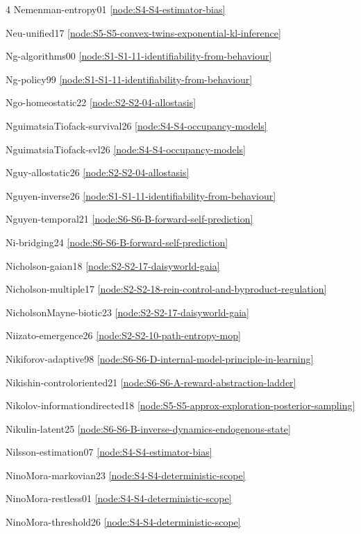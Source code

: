 \documentclass[10pt]{article}
\begin{document}
{\begin{multicols}{4}
Nemenman-entropy01 \hfill \ref{node:S4-S4-estimator-bias}\par
Neu-unified17 \hfill \ref{node:S5-S5-convex-twins-exponential-kl-inference}\par
Ng-algorithms00 \hfill \ref{node:S1-S1-11-identifiability-from-behaviour}\par
Ng-policy99 \hfill \ref{node:S1-S1-11-identifiability-from-behaviour}\par
Ngo-homeostatic22 \hfill \ref{node:S2-S2-04-allostasis}\par
NguimatsiaTiofack-survival26 \hfill \ref{node:S4-S4-occupancy-models}\par
NguimatsiaTiofack-svl26 \hfill \ref{node:S4-S4-occupancy-models}\par
Nguy-allostatic26 \hfill \ref{node:S2-S2-04-allostasis}\par
Nguyen-inverse26 \hfill \ref{node:S1-S1-11-identifiability-from-behaviour}\par
Nguyen-temporal21 \hfill \ref{node:S6-S6-B-forward-self-prediction}\par
Ni-bridging24 \hfill \ref{node:S6-S6-B-forward-self-prediction}\par
Nicholson-gaian18 \hfill \ref{node:S2-S2-17-daisyworld-gaia}\par
Nicholson-multiple17 \hfill \ref{node:S2-S2-18-rein-control-and-byproduct-regulation}\par
NicholsonMayne-biotic23 \hfill \ref{node:S2-S2-17-daisyworld-gaia}\par
Niizato-emergence26 \hfill \ref{node:S2-S2-10-path-entropy-mop}\par
Nikiforov-adaptive98 \hfill \ref{node:S6-S6-D-internal-model-principle-in-learning}\par
Nikishin-controloriented21 \hfill \ref{node:S6-S6-A-reward-abstraction-ladder}\par
Nikolov-informationdirected18 \hfill \ref{node:S5-S5-approx-exploration-posterior-sampling}\par
Nikulin-latent25 \hfill \ref{node:S6-S6-B-inverse-dynamics-endogenous-state}\par
Nilsson-estimation07 \hfill \ref{node:S4-S4-estimator-bias}\par
NinoMora-markovian23 \hfill \ref{node:S4-S4-deterministic-scope}\par
NinoMora-restless01 \hfill \ref{node:S4-S4-deterministic-scope}\par
NinoMora-threshold26 \hfill \ref{node:S4-S4-deterministic-scope}\par

\end{multicols}}
\end{document}
